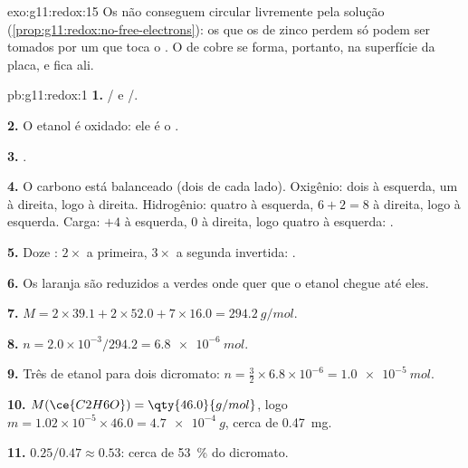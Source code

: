 \begin{solution}{exo:g11:redox:15}
Os  não conseguem circular livremente pela solução
(\cref{prop:g11:redox:no-free-electrons}): os que os  de zinco
perdem só podem ser tomados por um   que toca o . O
 de cobre se forma, portanto, na superfície da placa, e fica ali.
\end{solution}

\begin{solution}{pb:g11:redox:1}
\textbf{1.} / e /.

\textbf{2.} O etanol é oxidado: ele é o .

\textbf{3.} .

\textbf{4.} O carbono está balanceado (dois de cada lado). Oxigênio: dois
à esquerda, um à direita, logo  à direita. Hidrogênio: quatro à
esquerda, $6 + 2 = 8$ à direita, logo  à esquerda. Carga: $+4$ à
esquerda, 0 à direita, logo quatro  à esquerda:
.

\textbf{5.} Doze : $2\times$ a primeira, $3\times$ a segunda
invertida:
.

\textbf{6.} Os   laranja são reduzidos a 
 verdes onde quer que o etanol chegue até eles.

\textbf{7.} $M = 2\times 39.1 + 2\times 52.0 + 7\times 16.0 =
\qty{294.2}{g/mol}$.

\textbf{8.} $n = 2.0\times 10^{-3}/294.2 = \qty{6.8e-6}{mol}$.

\textbf{9.} Três  de etanol para dois  dicromato:
$n = \tfrac{3}{2}\times 6.8\times 10^{-6} = \qty{1.0e-5}{mol}$.

\textbf{10.} $M(\ce{C2H6O}) = \qty{46.0}{g/mol}$, logo
$m = 1.02\times 10^{-5}\times 46.0 = \qty{4.7e-4}{g}$, cerca de
\qty{0.47}{mg}.

\textbf{11.} $0.25/0.47 \approx 0.53$: cerca de \qty{53}{\percent} do
dicromato.


\end{solution}
